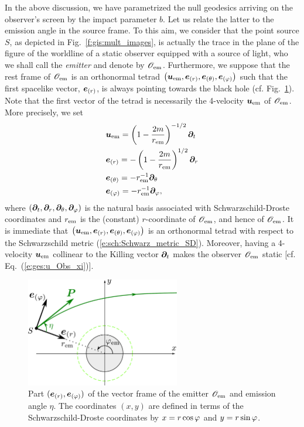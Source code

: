 In the above discussion, we have parametrized the null geodesics arriving
on the observer's screen by the impact parameter $b$. Let us relate the latter
to the emission angle in the source frame. To this aim, we consider that
the point source $S$, as depicted in Fig.~\ref{f:gis:mult_images}, is actually
the trace in the plane of the figure of the worldline of a static observer equipped
with a source of light, who we shall call the \emph{emitter} and denote
by $\mathscr{O}_{\rm em}$. Furthermore, we suppose that the rest frame of $\mathscr{O}_{\rm em}$
is an orthonormal tetrad
$\left(\bm{u}_{\rm em}, \bm{e}_{(r)}, \bm{e}_{(\theta)}, \bm{e}_{(\varphi)}\right)$ such
that the first spacelike vector, $\bm{e}_{(r)}$, is always pointing towards the
black hole (cf. Fig.~\ref{f:gis:static_obs}).
Note that the first vector of the tetrad is necessarily the
4-velocity $\bm{u}_{\rm em}$ of $\mathscr{O}_{\rm em}$. More precisely, we set
\begin{subequations}
\label{e:gis:bo_Obs_em}
\begin{align}
& \bm{u}_{\rm em} = \left( 1 - \frac{2m}{r_{\rm em}} \right)^{-1/2} \bm{\partial}_t \\
& \bm{e}_{(r)} = - \left( 1 - \frac{2m}{r_{\rm em}} \right)^{1/2} \bm{\partial}_r \\
& \bm{e}_{(\theta)} = - r_{\rm em}^{-1} \bm{\partial}_\theta \\
& \bm{e}_{(\varphi)} = - r_{\rm em}^{-1} \bm{\partial}_\varphi ,
\end{align}
\end{subequations}
where $(\bm{\partial}_t, \bm{\partial}_r, \bm{\partial}_\theta, \bm{\partial}_\varphi)$ is the natural basis associated
with Schwarzschild-Droste coordinates and $r_{\rm em}$ is the (constant) $r$-coordinate of
$\mathscr{O}_{\rm em}$, and hence of $\mathscr{O}_{\rm em}$.
It is immediate that $\left(\bm{u}_{\rm em}, \bm{e}_{(r)}, \bm{e}_{(\theta)}, \bm{e}_{(\varphi)}\right)$
is an orthonormal tetrad with respect to the Schwarzschild metric
(\ref{e:sch:Schwarz_metric_SD}). Moreover,
having a 4-velocity $\bm{u}_{\rm em}$ collinear to the Killing vector $\bm{\partial}_t$
makes the observer $\mathscr{O}_{\rm em}$ static [cf. Eq.~(\ref{e:ges:u_Obs_xi})].

\begin{figure}
\centerline{\includegraphics[width=0.6\textwidth]{gis_static_obs.pdf}}
\caption[]{\label{f:gis:static_obs} \footnotesize
Part $(\bm{e}_{(r)}, \bm{e}_{(\varphi)})$ of the vector frame of the emitter $\mathscr{O}_{\rm em}$
and emission angle $\eta$. The coordinates $(x,y)$ are defined in terms
of the Schwarzschild-Droste coordinates by $x=r\cos\varphi$ and $y=r\sin\varphi$.}
\end{figure}


